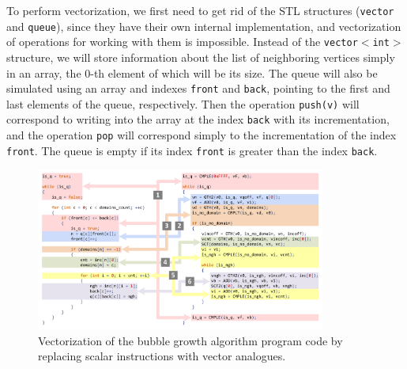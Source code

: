 \documentclass[
11pt,%
tightenlines,%
twoside,%
onecolumn,%
nofloats,%
nobibnotes,%
nofootinbib,%
superscriptaddress,%
noshowpacs,%
centertags]%
{revtex4}
\begin{document}
To perform vectorization, we first need to get rid of the STL structures (\texttt{vector} and \texttt{queue}), since they have their own internal implementation, and vectorization of operations for working with them is impossible.
Instead of the \texttt{vector$<$int$>$} structure, we will store information about the list of neighboring vertices simply in an array, the 0-th element of which will be its size.
The queue will also be simulated using an array and indexes \texttt{front} and \texttt{back}, pointing to the first and last elements of the queue, respectively.
Then the operation \texttt{push(v)} will correspond to writing into the array at the index \texttt{back} with its incrementation, and the operation \texttt{pop} will correspond simply to the incrementation of the index \texttt{front}.
The queue is empty if its index \texttt{front} is greater than the index \texttt{back}.

\begin{figure}[h]
\setcaptionmargin{5mm}
\onelinecaptionsfalse %
\includegraphics[width=0.85\textwidth]{pics/code.pdf}
\caption{Vectorization of the bubble growth algorithm program code by replacing scalar instructions with vector analogues.}\label{fig:code}
\end{figure}
\end{document}
